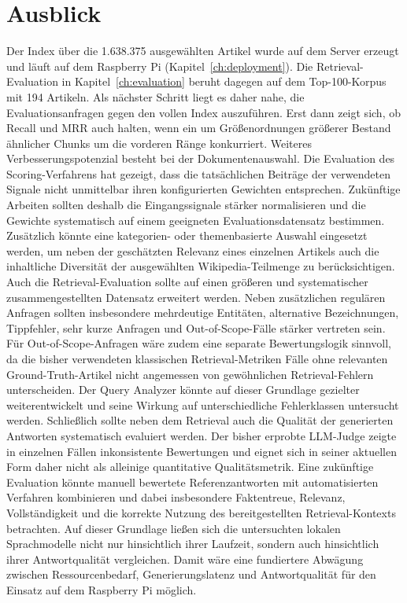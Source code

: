 \section{Ausblick}

Der Index über die 1.638.375 ausgewählten Artikel wurde auf dem Server
erzeugt und läuft auf dem Raspberry Pi (Kapitel~\ref{ch:deployment}). Die
Retrieval-Evaluation in Kapitel~\ref{ch:evaluation} beruht dagegen auf dem
Top-100-Korpus mit 194 Artikeln. Als nächster Schritt liegt es daher nahe,
die Evaluationsanfragen gegen den vollen Index auszuführen. Erst dann zeigt
sich, ob Recall und MRR auch halten, wenn ein um Größenordnungen größerer
Bestand ähnlicher Chunks um die vorderen Ränge konkurriert.
Weiteres Verbesserungspotenzial besteht bei der Dokumentenauswahl. Die
Evaluation des Scoring-Verfahrens hat gezeigt, dass die tatsächlichen Beiträge
der verwendeten Signale nicht unmittelbar ihren konfigurierten Gewichten
entsprechen. Zukünftige Arbeiten sollten deshalb die Eingangssignale stärker
normalisieren und die Gewichte systematisch auf einem geeigneten
Evaluationsdatensatz bestimmen. Zusätzlich könnte eine kategorien- oder
themenbasierte Auswahl eingesetzt werden, um neben der geschätzten Relevanz
eines einzelnen Artikels auch die inhaltliche Diversität der ausgewählten
Wikipedia-Teilmenge zu berücksichtigen.
Auch die Retrieval-Evaluation sollte auf einen größeren und systematischer
zusammengestellten Datensatz erweitert werden. Neben zusätzlichen regulären
Anfragen sollten insbesondere mehrdeutige Entitäten, alternative
Bezeichnungen, Tippfehler, sehr kurze Anfragen und Out-of-Scope-Fälle stärker
vertreten sein. Für Out-of-Scope-Anfragen wäre zudem eine separate
Bewertungslogik sinnvoll, da die bisher verwendeten klassischen
Retrieval-Metriken Fälle ohne relevanten Ground-Truth-Artikel nicht angemessen
von gewöhnlichen Retrieval-Fehlern unterscheiden. Der Query Analyzer könnte
auf dieser Grundlage gezielter weiterentwickelt und seine Wirkung auf
unterschiedliche Fehlerklassen untersucht werden.
Schließlich sollte neben dem Retrieval auch die Qualität der generierten
Antworten systematisch evaluiert werden. Der bisher erprobte LLM-Judge zeigte
in einzelnen Fällen inkonsistente Bewertungen und eignet sich in seiner
aktuellen Form daher nicht als alleinige quantitative Qualitätsmetrik. Eine
zukünftige Evaluation könnte manuell bewertete Referenzantworten mit
automatisierten Verfahren kombinieren und dabei insbesondere Faktentreue,
Relevanz, Vollständigkeit und die korrekte Nutzung des bereitgestellten
Retrieval-Kontexts betrachten. Auf dieser Grundlage ließen sich die
untersuchten lokalen Sprachmodelle nicht nur hinsichtlich ihrer Laufzeit,
sondern auch hinsichtlich ihrer Antwortqualität vergleichen. Damit wäre eine
fundiertere Abwägung zwischen Ressourcenbedarf, Generierungslatenz und
Antwortqualität für den Einsatz auf dem Raspberry Pi möglich.
